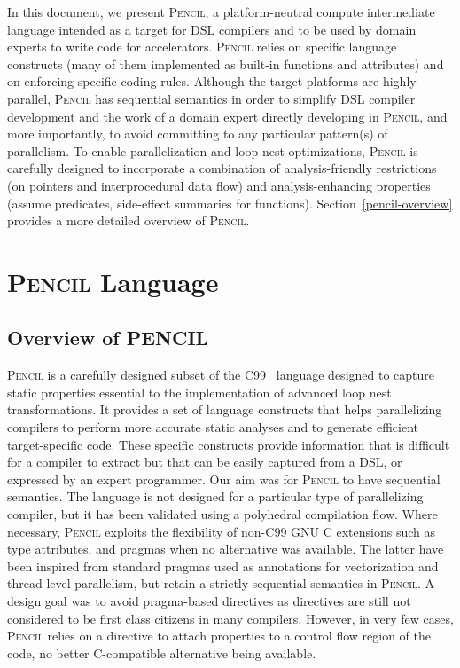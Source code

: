 \documentclass{carp}
\newcommand\pencil{\textsc{Pencil}\xspace}
\begin{document}
In this document, we present \pencil, a platform-neutral compute intermediate
language intended as a target for DSL compilers and to be used by domain
experts to write code for accelerators.
\pencil relies on specific language constructs (many of
them implemented as built-in functions and attributes) and on enforcing
specific coding rules. Although the target platforms are highly parallel,
\pencil has sequential semantics in order to simplify DSL
compiler development and the work of a domain expert directly
developing in \pencil, and more importantly, to avoid committing to
any particular pattern(s) of parallelism.  To enable parallelization
and loop nest optimizations, \pencil is carefully designed to
incorporate a combination of analysis-friendly restrictions (on
pointers and interprocedural data flow) and analysis-enhancing
properties (assume predicates, side-effect summaries for functions).
Section~\ref{pencil-overview} provides a more detailed overview of \pencil.


\chapter{\pencil Language}

\section{Overview of PENCIL \label{pencil-overview}}

\pencil is a carefully designed subset of the C99~\cite{c99} language
designed to capture static properties essential to the implementation
of advanced loop nest transformations.
It provides a set of language constructs that helps parallelizing
compilers to perform more accurate static analyses and to generate
efficient target-specific code.
These specific constructs provide information that is difficult for a
compiler to extract but that can be easily captured from a DSL, or
expressed by an expert programmer.
Our aim was for \pencil to have sequential semantics.
The language is not designed for a particular type of
parallelizing compiler, but it has been validated using a polyhedral
compilation flow.
Where necessary, \pencil exploits the flexibility of non-C99 GNU
C extensions such as type attributes, and pragmas when no alternative
was available.
The latter have been inspired from standard pragmas used as annotations
for vectorization and thread-level parallelism, but retain a strictly
sequential semantics in \pencil.
A design goal was to avoid pragma-based directives as directives are still
not considered to be first class citizens in many compilers.
However, in very few cases, \pencil relies on a directive to attach
properties to a control flow region of the code, no better C-compatible
alternative being available.
\end{document}
